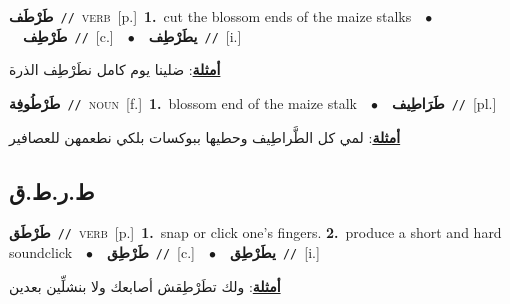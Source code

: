 \documentclass[10pt,a4paper,twoside]{article} %
\begin{document}
\begin{multicols}{2}
{\setlength\topsep{0pt}\textbf{\foreignlanguage{arabic}{طَرْطَف}}\ {\color{gray}\texttt{//}\color{black}}\ \textsc{verb}\ [p.]\ \textbf{1.}~cut the blossom ends of the maize stalks\ \ $\bullet$\ \ \setlength\topsep{0pt}\textbf{\foreignlanguage{arabic}{طَرْطِف}}\ {\color{gray}\texttt{//}\color{black}}\ [c.]\ \ $\bullet$\ \ \setlength\topsep{0pt}\textbf{\foreignlanguage{arabic}{يطَرْطِف}}\ {\color{gray}\texttt{//}\color{black}}\ [i.]\  \begin{flushright}\color{gray}\foreignlanguage{arabic}{\textbf{\underline{\foreignlanguage{arabic}{أمثلة}}}: ضلينا يوم كامل نطَرْطِف الذرة}\end{flushright}\color{black}} \vspace{2mm}

{\setlength\topsep{0pt}\textbf{\foreignlanguage{arabic}{طَرْطُوفِة}}\ {\color{gray}\texttt{//}\color{black}}\ \textsc{noun}\ [f.]\ \textbf{1.}~blossom end of the maize stalk\ \ $\bullet$\ \ \setlength\topsep{0pt}\textbf{\foreignlanguage{arabic}{طَرَاطِيف}}\ {\color{gray}\texttt{//}\color{black}}\ [pl.]\  \begin{flushright}\color{gray}\foreignlanguage{arabic}{\textbf{\underline{\foreignlanguage{arabic}{أمثلة}}}: لمي كل الطَّراطِيف وحطيها ببوكسات بلكي نطعمهن للعصافير}\end{flushright}\color{black}} \vspace{2mm}

\vspace{-3mm}
\subsection*{\color{blue}\foreignlanguage{arabic}{ط.ر.ط.ق}\color{blue}{}} 

{\setlength\topsep{0pt}\textbf{\foreignlanguage{arabic}{طَرْطَق}}\ {\color{gray}\texttt{//}\color{black}}\ \textsc{verb}\ [p.]\ \textbf{1.}~snap or click one's fingers.  \textbf{2.}~produce a short and hard soundclick\ \ $\bullet$\ \ \setlength\topsep{0pt}\textbf{\foreignlanguage{arabic}{طَرْطِق}}\ {\color{gray}\texttt{//}\color{black}}\ [c.]\ \ $\bullet$\ \ \setlength\topsep{0pt}\textbf{\foreignlanguage{arabic}{يطَرْطِق}}\ {\color{gray}\texttt{//}\color{black}}\ [i.]\  \begin{flushright}\color{gray}\foreignlanguage{arabic}{\textbf{\underline{\foreignlanguage{arabic}{أمثلة}}}: ولك تطَرْطِقش أصابعك ولا بنشلِّين بعدين}\end{flushright}\color{black}} \vspace{2mm}


\end{multicols}
\end{document}
